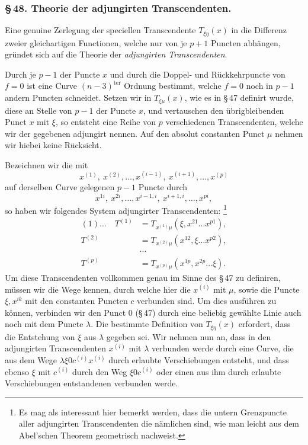 \documentclass[10pt]{article}
\begin{document}
\subsubsection*{\S\,48. Theorie der adjungirten Transcendenten.}

Eine genuine Zerlegung der speciellen Transcendente \(T_{\xi\eta}(x)\) in die Differenz zweier gleichartigen Functionen, welche nur von je \(p+1\) Puncten abhängen, gründet sich auf die Theorie der \emph{adjungirten Transcendenten}.

Durch je \(p-1\) der Puncte \(x\) und durch die Doppel- und Rückkehrpuncte von \(f=0\) ist eine Curve \((n-3)^{\mathrm{ter}}\) Ordnung bestimmt, welche \(f=0\) noch in \(p-1\) andern Puncten schneidet. Setzen wir in \(T_{\xi\mu}(x)\), wie es in \S\,47 definirt wurde, diese an Stelle von \(p-1\) der Puncte \(x\), und vertauschen den übrigbleibenden Punct \(x\) mit \(\xi\), so entsteht eine Reihe von \(p\) verschiedenen Transcendenten, welche wir der gegebenen adjungirt nennen. Auf den absolut constanten Punct \(\mu\) nehmen wir hiebei keine Rücksicht.

Bezeichnen wir die mit
\[
x^{(1)},\ x^{(2)},\ldots,x^{(i-1)},\ x^{(i+1)},\ldots,x^{(p)}
\]
auf derselben Curve gelegenen \(p-1\) Puncte durch
\[
x^{1i},\ x^{2i},\ldots,x^{i-1,i},\ x^{i+1,i},\ldots,x^{pi},
\]
so haben wir folgendes System adjungirter Transcendenten: \footnote{Es mag als interessant hier bemerkt werden, dass die untern Grenzpuncte aller adjungirten Transcendenten die nämlichen sind, wie man leicht aus dem Abel'schen Theorem geometrisch nachweist.}
\[
\begin{aligned}
(1)\ldots\quad T^{(1)}&=T_{x^{(1)}\mu}(\xi,x^{21}\ldots x^{p1}),\\
T^{(2)}&=T_{x^{(2)}\mu}(x^{12},\xi\ldots x^{p2}),\\[-0.35em]
&\cdots\\[-0.35em]
T^{(p)}&=T_{x^{(p)}\mu}(x^{1p},x^{2p}\ldots \xi).
\end{aligned}
\]
Um diese Transcendenten vollkommen genau im Sinne des \S\,47 zu definiren, müssen wir die Wege kennen, durch welche hier die \(x^{(i)}\) mit \(\mu\), sowie die Puncte \(\xi,x^{ik}\) mit den constanten Puncten \(c\) verbunden sind. Um dies ausführen zu können, verbinden wir den Punct \(0\) (\S\,47) durch eine beliebig gewählte Linie auch noch mit dem Puncte \(\lambda\). Die bestimmte Definition von \(T_{\xi\eta}(x)\) erfordert, dass die Entstehung von \(\xi\) aus \(\lambda\) gegeben sei. Wir nehmen nun an, dass in den adjungirten Transcendenten \(x^{(i)}\) mit \(\lambda\) verbunden werde durch eine Curve, die aus dem Wege \(\lambda\xi0c^{(i)}x^{(i)}\) durch erlaubte Verschiebungen entsteht, und dass ebenso \(\xi\) mit \(c^{(i)}\) durch den Weg \(\xi0c^{(i)}\) oder einen aus ihm durch erlaubte Verschiebungen entstandenen verbunden werde.
\end{document}
